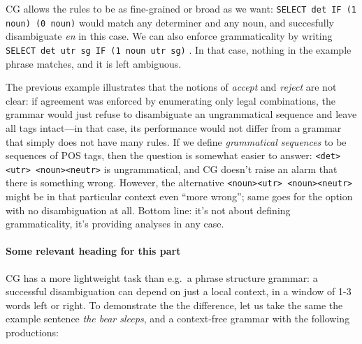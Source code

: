 CG allows the rules to be as fine-grained or broad as we want: 
\texttt{SELECT det IF (1 noun) (0 noun)} would match any determiner and any noun, 
and succesfully disambiguate \emph{en} in this case. 
We can also enforce grammaticality by writing \texttt{SELECT det utr sg IF (1 noun utr sg)}%
. In that case, nothing in the example phrase matches, and it is left ambiguous.



The previous example illustrates that the notions of \emph{accept} and \emph{reject} are not clear: if agreement was enforced
by enumerating only legal combinations, the grammar would just refuse to disambiguate
an ungrammatical sequence and leave all tags intact---in that case,
its performance would not differ from a grammar that simply does not have many rules.
If we define \emph{grammatical sequences} to be sequences of POS tags,
then the question is somewhat easier to answer: \texttt{\textless{}det\textgreater{}\textless{}utr\textgreater{} \textless{}noun\textgreater{}\textless{}neutr\textgreater{}} is ungrammatical, and CG doesn't raise an alarm that there is something wrong. However, the alternative \texttt{\textless{}noun\textgreater{}\textless{}utr\textgreater{} \textless{}noun\textgreater{}\textless{}neutr\textgreater{}} might be in that particular context even ``more wrong''; same goes for the option with no disambiguation at all.
Bottom line: it's not about defining grammaticality, it's providing analyses in any case.


\paragraph{Some relevant heading for this part} CG has a more lightweight task than e.g.~a phrase structure grammar: a
successful disambiguation can depend on just a local context, in a
window of 1-3 words left or right. To demonstrate the the difference,
let us take the same the example sentence \emph{the bear sleeps}, and a
context-free grammar with the following productions:



